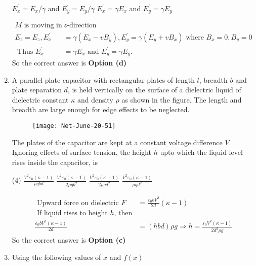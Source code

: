 \begin{enumerate}
\begin{tasks}
	\task[\textbf{c.}]$E_{x}^{\prime}=E_{x} / \gamma$ and $E_{y}^{\prime}=E_{y} / \gamma$
	\task[\textbf{d.}]  $E_{x}^{\prime}=\gamma E_{x}$ and $E_{y}^{\prime}=\gamma E_{y}$
\end{tasks}
\begin{answer}
	\begin{align*}
	M \text { is moving in }& z \text {-direction }\\
	E_{z}^{\prime}=E_{z}, E_{x}^{\prime}&=\gamma\left(E_{x}-v B_{y}\right), E_{y}^{\prime}=\gamma\left(E_{y}+v B_{x}\right)\text{ where }B_{x}=0, B_{y}=0\\
	\text{ Thus }E_{x}^{\prime}&=\gamma E_{x}\text{ and } E_{y}^{\prime}=\gamma E_{y}.
	\end{align*}
	So the correct answer is \textbf{Option (d)}
\end{answer}
\item A parallel plate capacitor with rectangular plates of length $l$, breadth $b$ and plate separation $d$, is held vertically on the surface of a dielectric liquid of dielectric constant $\kappa$ and density $\rho$ as shown in the figure. The length and breadth are large enough for edge effects to be neglected.
\begin{figure}[H]
	\centering
	\texttt{[image: Net-June-20-51]}
\end{figure}
The plates of the capacitor are kept at a constant voltage difference $V$. Ignoring effects of surface tension, the height $h$ upto which the liquid level rises inside the capacitor, is
 \begin{tasks}(4)
	\task[\textbf{a.}]$\frac{V^{2} \varepsilon_{0}(\kappa-1)}{\rho g b d}$
	\task[\textbf{b.}]$\frac{V^{2} \varepsilon_{0}(\kappa-1)}{2 \rho g b^{2}}$
	\task[\textbf{c.}]$\frac{V^{2} \varepsilon_{0}(\kappa-1)}{2 \rho g d^{2}}$
	\task[\textbf{d.}] $\frac{V^{2} \varepsilon_{0}(\kappa-1)}{\rho g d^{2}}$
\end{tasks}
\begin{answer}
	\begin{align*}
	\text { Upward force on dielectric } F&=\frac{\varepsilon_{0} b V^{2}}{2 d}(\kappa-1)\\
\text{	If liquid rises to height $h$, then}\\
	\frac{\varepsilon_{0} b V^{2}(\kappa-1)}{2 d}&=(h b d) \rho g \Rightarrow h=\frac{\varepsilon_{0} V^{2}(\kappa-1)}{2 d^{2} \rho g}
	\end{align*}
	So the correct answer is \textbf{Option (c)}
\end{answer}
\item  Using the following values of $x$ and $f(x)$\\\\

\end{enumerate}
